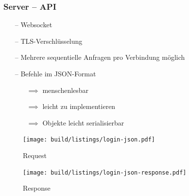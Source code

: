 \documentclass[aspectratio=1610]{beamer}
\begin{document}
  \begin{frame}[plain]
      \frametitle{\textbf{Server} -- API}
      \begin{minipage}{0.45\textwidth}
          \begin{itemize}
              \item[--] Websocket
              \item[--] TLS-Verschlüsselung
              \item[--] Mehrere sequentielle Anfragen pro Verbindung möglich
              \item[--] Befehle im JSON-Format
                  \begin{itemize}
                      \item[$\implies$] menschenlesbar
                      \item[$\implies$] leicht zu implementieren
                      \item[$\implies$] Objekte leicht serialisierbar
                  \end{itemize}
          \end{itemize}
      \end{minipage}%
      \hspace{.05\textwidth}%
      \begin{minipage}{0.5\textwidth}
          \begin{figure}
              \texttt{[image: build/listings/login-json.pdf]}
              \caption{Request}
          \end{figure}
          \begin{figure}
              \texttt{[image: build/listings/login-json-response.pdf]}
              \caption{Response}
          \end{figure}
      \end{minipage}%
  \end{frame}
\end{document}
